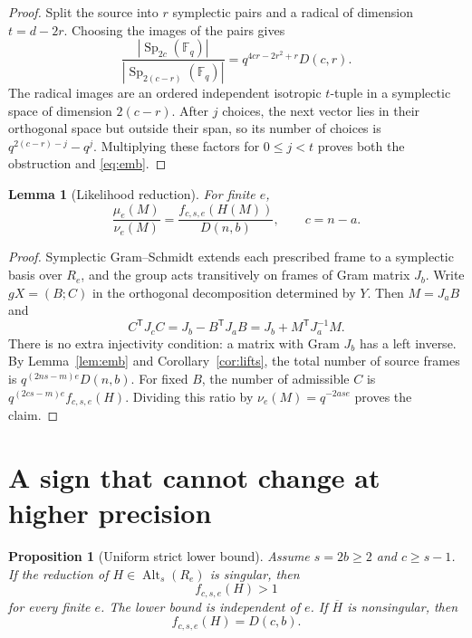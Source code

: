 \documentclass[11pt]{article}
\newtheorem{lemma}[theorem]{Lemma}
\newtheorem{proposition}[theorem]{Proposition}
\theoremstyle{remark}
\newcommand{\FF}{\mathbb F}
\newcommand{\Alt}{\operatorname{Alt}}
\newcommand{\Sp}{\operatorname{Sp}}
\newcommand{\trans}{\mathsf T}
\begin{document}
\begin{proof}
Split the source into \(r\) symplectic pairs and a radical of dimension
\(t=d-2r\). Choosing the images of the pairs gives
\[
 \frac{|\Sp_{2c}(\FF_q)|}{|\Sp_{2(c-r)}(\FF_q)|}
   =q^{4cr-2r^2+r}D(c,r).
\]
The radical images are an ordered independent isotropic \(t\)-tuple
in a symplectic space of dimension \(2(c-r)\). After \(j\) choices,
the next vector lies in their orthogonal space but outside their span,
so its number of choices is \(q^{2(c-r)-j}-q^j\).
Multiplying these factors for \(0\le j<t\) proves both the obstruction
and \eqref{eq:emb}.
\end{proof}

\begin{lemma}[Likelihood reduction]\label{lem:likelihood}
For finite \(e\),
\[
 \frac{\mu_e(M)}{\nu_e(M)}
   =\frac{f_{c,s,e}(H(M))}{D(n,b)},\qquad c=n-a.
 \tag{3.5}\label{eq:likelihood}
\]
\end{lemma}

\begin{proof}
Symplectic Gram--Schmidt extends each prescribed frame to a symplectic
basis over \(R_e\), and the group acts transitively on frames of Gram
matrix \(J_b\). Write \(gX=(B;C)\) in the orthogonal decomposition
determined by \(Y\). Then \(M=J_aB\) and
\[
 C^\trans J_cC=J_b-B^\trans J_aB
              =J_b+M^\trans J_a^{-1}M.
\]
There is no extra injectivity condition: a matrix with Gram \(J_b\)
has a left inverse. By Lemma~\ref{lem:emb} and
Corollary~\ref{cor:lifts}, the total number of source frames is
\(q^{(2ns-m)e}D(n,b)\). For fixed \(B\), the number of admissible \(C\)
is \(q^{(2cs-m)e}f_{c,s,e}(H)\).
Dividing this ratio by \(\nu_e(M)=q^{-2ase}\) proves the claim.
\end{proof}

\section{A sign that cannot change at higher precision}

\begin{proposition}[Uniform strict lower bound]\label{prop:sign}
Assume \(s=2b\ge2\) and \(c\ge s-1\).
If the reduction of \(H\in\Alt_s(R_e)\) is singular, then
\[
 f_{c,s,e}(H)>1
 \tag{4.1}\label{eq:strictsign}
\]
for every finite \(e\). The lower bound is independent of \(e\).
If \(\overline H\) is nonsingular, then
\[
 f_{c,s,e}(H)=D(c,b).
 \tag{4.2}\label{eq:nonsingsign}
\]
\end{proposition}
\end{document}
